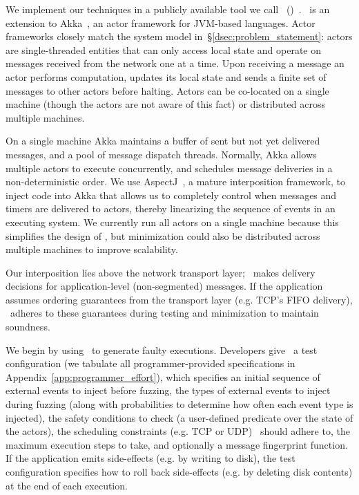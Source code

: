 We implement our techniques in a publicly available tool we call \sys~(\system)~\cite{our_repo}. \sys~is an extension
to Akka~\cite{akka}, an actor
framework for JVM-based languages.
Actor frameworks closely match the system model in~\S\ref{dsec:problem_statement}: actors
are single-threaded entities that can only access local state and operate on messages
received from the network one at a time. Upon receiving a message an actor performs computation,
updates its local state and sends a finite set of messages to other actors
before halting. Actors can be co-located
on a single machine (though the actors are not aware of this fact) or distributed across multiple machines.

On a single machine Akka maintains a buffer of sent but not yet delivered
messages, and a pool of message dispatch threads.
Normally, Akka allows multiple actors to execute
concurrently, and schedules message deliveries in a
non-deterministic order. We use AspectJ~\cite{kiczales2001overview}, a mature interposition framework,
to inject code into Akka that allows us to completely control when messages
and timers are
delivered to actors, thereby linearizing the sequence of events in an executing system.
We currently run all actors on a single machine because this simplifies the
design of \sys,
but minimization could also be distributed across multiple machines to improve
scalability.

Our interposition lies above the network transport layer; \sys~makes
delivery decisions for application-level (non-segmented) messages.
If the application assumes ordering guarantees from the transport
layer (e.g. TCP's FIFO delivery), \sys~adheres to these guarantees
during testing and minimization to maintain soundness.

 We begin by using \sys~to generate
faulty executions. Developers give \sys~a test configuration (we
tabulate all programmer-provided specifications in
Appendix~\ref{app:programmer_effort}), which
specifies an initial sequence of external events to inject before fuzzing, the types
of external events to inject during fuzzing (along with probabilities to
determine how often each event type is injected), the safety conditions to
check (a user-defined predicate over the state of the actors), the scheduling constraints (e.g. TCP or UDP) \sys~should
adhere to, the maximum execution steps to take, and
optionally a message fingerprint function. If the
application emits side-effects (e.g. by writing to disk), the test configuration specifies how
to roll back side-effects (e.g. by deleting disk contents) at the end of each execution.

